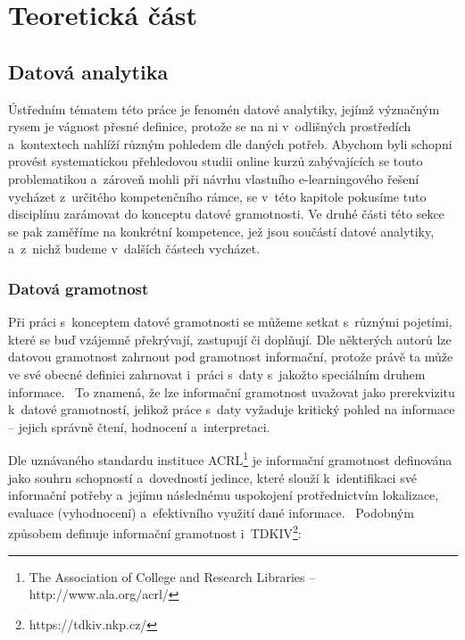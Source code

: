 \part{Teoretická část}

\hypertarget{datovuxe1-analytika}{%
\chapter{Datová analytika}\label{datovuxe1-analytika}}

Ústředním tématem této práce je fenomén datové analytiky, jejímž význačným rysem je vágnost přesné definice, protože se na ni v~odlišných prostředích a~kontextech nahlíží různým pohledem dle daných potřeb. Abychom byli schopni provést systematickou přehledovou studii online kurzů zabývajících se touto problematikou a~zároveň mohli při návrhu vlastního e-learningového řešení vycházet z~určitého kompetenčního rámce, se v~této kapitole pokusíme tuto disciplínu zarámovat do konceptu datové gramotnosti. Ve druhé části této sekce se pak zaměříme na konkrétní kompetence, jež jsou součástí datové analytiky, a~z~nichž budeme v~dalších částech vycházet.

\hypertarget{datovuxe1-gramotnost}{%
\section{Datová gramotnost}\label{datovuxe1-gramotnost}}

Při práci s~konceptem datové gramotnosti se můžeme setkat s~různými pojetími, které se buď vzájemně překrývají, zastupují či doplňují. Dle některých autorů lze datovou gramotnost zahrnout pod gramotnost informační, protože právě ta může ve své obecné definici zahrnovat i~práci s~daty s~jakožto speciálním druhem informace.~\parencite[126]{calzada13} To znamená, že lze informační gramotnost uvažovat jako prerekvizitu k~datové gramotností, jelikož práce s~daty vyžaduje kritický pohled na informace -- jejich správně čtení, hodnocení a~interpretaci.

Dle uznávaného standardu instituce ACRL\footnote{The Association of College and Research Libraries – http://www.ala.org/acrl/} je informační gramotnost definována jako souhrn schopností a~dovedností jedince, které slouží k~identifikaci své informační potřeby a~jejímu následnému uspokojení protřednictvím lokalizace, evaluace (vyhodnocení) a~efektivního využití dané informace.~\parencite[2]{acrl14} Podobným způsobem definuje informační gramotnost i~TDKIV\footnote{https://tdkiv.nkp.cz/}: ~\parencite{tdkiv03}

